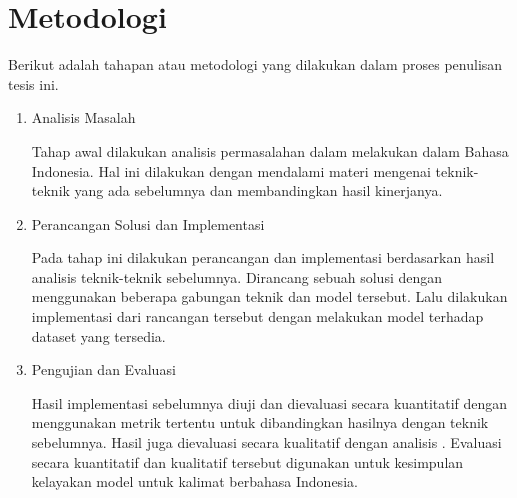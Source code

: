 \section{Metodologi}

Berikut adalah tahapan atau metodologi yang dilakukan dalam proses penulisan tesis ini.

\begin{enumerate}
  \item Analisis Masalah

  Tahap awal dilakukan analisis permasalahan dalam melakukan \amrparsing{} dalam Bahasa Indonesia.
  Hal ini dilakukan dengan mendalami materi mengenai teknik-teknik \amrparsing{} yang ada sebelumnya dan membandingkan hasil kinerjanya.

  \item Perancangan Solusi dan Implementasi

  Pada tahap ini dilakukan perancangan dan implementasi berdasarkan hasil analisis teknik-teknik \amrparsing{} sebelumnya.
  Dirancang sebuah solusi dengan menggunakan beberapa gabungan teknik dan model tersebut.
  Lalu dilakukan implementasi dari rancangan tersebut dengan melakukan  model terhadap dataset yang tersedia.

  \item Pengujian dan Evaluasi

  Hasil implementasi sebelumnya diuji dan dievaluasi secara kuantitatif dengan menggunakan metrik tertentu untuk dibandingkan hasilnya dengan teknik sebelumnya.
  Hasil \amrparsing{} juga dievaluasi secara kualitatif dengan analisis \transdiver{}.
  Evaluasi secara kuantitatif dan kualitatif tersebut digunakan untuk kesimpulan kelayakan model \amrparsing{} \crosslingual{} untuk kalimat berbahasa Indonesia.

\end{enumerate}
